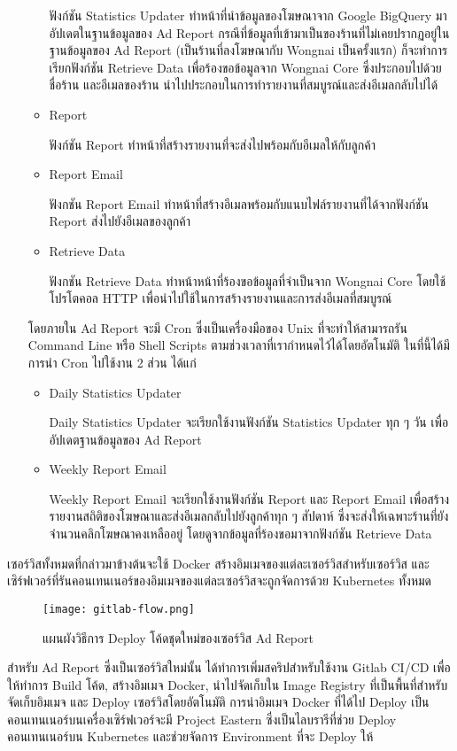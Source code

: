 \begin{enumerate}
\begin{itemize}
		 ฟังก์ชัน Statistics Updater ทำหน้าที่นำข้อมูลของโฆษณาจาก Google BigQuery มาอัปเดตในฐานข้อมูลของ Ad Report กรณีที่ข้อมูลที่เข้ามาเป็นของร้านที่ไม่เคยปรากฏอยู่ในฐานข้อมูลของ Ad Report (เป็นร้านที่ลงโฆษณากับ Wongnai เป็นครั้งแรก) ก็จะทำการเรียกฟังก์ชัน Retrieve Data เพื่อร้องขอข้อมูลจาก Wongnai Core ซึ่งประกอบไปด้วยชื่อร้าน และอีเมลของร้าน นำไปประกอบในการทำรายงานที่สมบูรณ์และส่งอีเมลกลับไปได้
		\item Report
		
		ฟังก์ชัน Report ทำหน้าที่สร้างรายงานที่จะส่งไปพร้อมกับอีเมลให้กับลูกค้า
		\item Report Email
		
		ฟังกชัน Report Email ทำหน้าที่สร้างอีเมลพร้อมกับแนบไฟล์รายงานที่ได้จากฟังก์ชัน Report ส่งไปยังอีเมลของลูกค้า
		\item Retrieve Data
		
		ฟังกชัน Retrieve Data ทำหน้าหน้าที่ร้องขอข้อมูลที่จำเป็นจาก Wongnai Core โดยใช้โปรโตคอล HTTP เพื่อนำไปใช้ในการสร้างรายงานและการส่งอีเมลที่สมบูรณ์
	\end{itemize}
	โดยภายใน Ad Report จะมี Cron ซึ่งเป็นเครื่องมือของ Unix ที่จะทำให้สามารถรัน Command Line หรือ Shell Scripts ตามช่วงเวลาที่เรากำหนดไว้ได้โดยอัตโนมัติ ในที่นี้ได้มีการนำ Cron ไปใช้งาน 2 ส่วน ได้แก่
	\begin{itemize}
		\item Daily Statistics Updater
		
		Daily Statistics Updater จะเรียกใช้งานฟังก์ชัน Statistics Updater ทุก ๆ วัน เพื่ออัปเดตฐานข้อมูลของ Ad Report
		\item Weekly Report Email
		
		Weekly Report Email จะเรียกใช้งานฟังก์ชัน Report และ Report Email เพื่อสร้างรายงานสถิติของโฆษณาและส่งอีเมลกลับไปยังลูกค้าทุก ๆ สัปดาห์ ซึ่งจะส่งให้เฉพาะร้านที่ยังจำนวนคลิกโฆษณาคงเหลืออยู่ โดยดูจากข้อมูลที่ร้องขอมาจากฟังก์ชัน Retrieve Data
	\end{itemize}
\end{enumerate}

เซอร์วิสทั้งหมดที่กล่าวมาข้างต้นจะใช้ Docker สร้างอิมเมจของแต่ละเซอร์วิสสำหรับเซอร์วิส และเซิร์ฟเวอร์ที่รันคอนเทนเนอร์ของอิมเมจของแต่ละเซอร์วิสจะถูกจัดการด้วย Kubernetes ทั้งหมด
\begin{figure}[!h]
	\centering
	\texttt{[image: gitlab-flow.png]}  
	\caption{แผนผังวิธีการ Deploy โค้ดชุดใหม่ของเซอร์วิส Ad Report}
	\label{Fig:adreport-diagram}
\end{figure}

สำหรับ Ad Report ซึ่งเป็นเซอร์วิสใหม่นั้น ได้ทำการเพิ่มสคริปสำหรับใช้งาน Gitlab CI/CD เพื่อให้ทำการ Build โค้ด, สร้างอิมเมจ Docker, นำไปจัดเก็บใน Image Registry ที่เป็นพื้นที่สำหรับจัดเก็บอิมเมจ และ Deploy เซอร์วิสโดยอัตโนมัติ การนำอิมเมจ Docker ที่ได้ไป Deploy เป็นคอนเทนเนอร์บนเครื่องเซิร์ฟเวอร์จะมี Project Eastern ซึ่งเป็นไลบรารีที่ช่วย Deploy คอนเทนเนอร์บน Kubernetes และช่วยจัดการ Environment ที่จะ Deploy ให้ ~\cite{eastern} 

